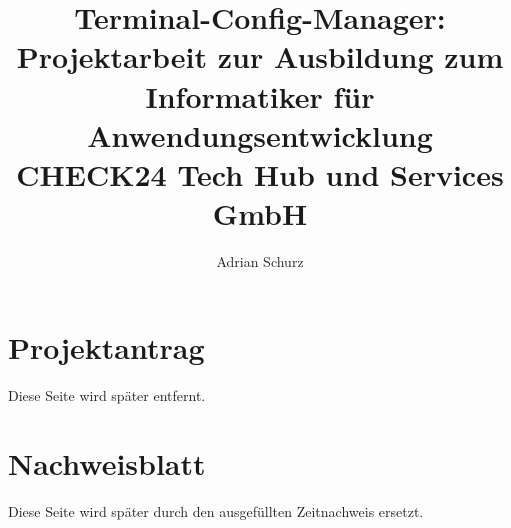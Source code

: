 \documentclass[a4paper,11pt,draft=false,bibliography=totoc]{scrartcl} %
\author{Adrian Schurz}
\title{Terminal-Config-Manager:\\
	Projektarbeit zur Ausbildung zum Informatiker für Anwendungsentwicklung\\
	CHECK24 Tech Hub und Services GmbH\\
	}
\begin{document}

\titlehead{\centering\texttt{[image: header.png]}}
\maketitle
{}
\newpage

\section{Projektantrag}
\begin{center}
	Diese Seite wird später entfernt.
\end{center}


\section{Nachweisblatt}
\begin{center}
	Diese Seite wird später durch den ausgefüllten Zeitnachweis ersetzt.
\end{center}

\newpage
\tableofcontents
\newpage

















\newpage
\printbibliography

\newpage
\printglossaries
\end{document}
